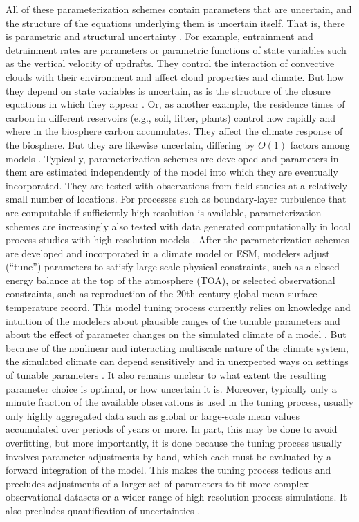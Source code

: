\documentclass[draft]{agujournal}
\begin{document}
All of these parameterization schemes contain parameters that are uncertain, and the structure of the equations underlying them is uncertain itself. That is, there is parametric and structural uncertainty \citep{Draper95}. For example, entrainment and detrainment rates are parameters or parametric functions of state variables such as the vertical velocity of updrafts. They control the interaction of convective clouds with their environment and affect cloud properties and climate. But how they depend on state variables is uncertain, as is the structure of the closure equations in which they appear \citep[e.g.,][]{Stainforth05a,Holloway09a,Neelin09a,Romps10a,Nie12a,de-Rooy13a}. Or, as another example, the residence times of carbon in different reservoirs (e.g., soil, litter, plants) control how rapidly and where in the biosphere carbon accumulates. They affect the climate response of the biosphere. But they are likewise uncertain, differing by $O(1)$ factors among models \citep{Friedlingstein06a,Friedlingstein14a,Friend14a,Bloom16a}. Typically, parameterization schemes are developed and parameters in them are estimated independently of the  model into which they are eventually incorporated. They are tested with observations from field studies at a relatively small number of locations. For processes such as boundary-layer turbulence that are computable if sufficiently high resolution is available, parameterization schemes are increasingly also tested with data generated computationally in local process studies with high-resolution models \citep[e.g.,][]{Jakob03a,Jakob10a}. After the parameterization schemes are developed and incorporated in a climate model or ESM, modelers adjust (``tune'') parameters to satisfy large-scale  physical constraints, such as a closed energy balance at the top of the atmosphere (TOA), or selected observational constraints, such as reproduction of the 20th-century global-mean surface temperature record. This model tuning process currently relies on  knowledge and intuition of the modelers about plausible ranges of the tunable parameters and about the effect of parameter changes on the simulated climate of a model \citep{Randall97a,Mauritsen12a, Golaz13a,Hourdin13a, Flato13a, Hourdin17a}. But because of the nonlinear and interacting multiscale nature of the climate system, the simulated climate can depend sensitively and in unexpected ways on settings of tunable parameters \citep[e.g.,][]{Suzuki13a,Zhao16a}. It also remains unclear to what extent the resulting parameter choice is optimal, or how uncertain it is. Moreover, typically only a minute fraction of the available observations is used in the tuning process, usually only highly aggregated data such as global or large-scale mean values accumulated over periods of years or more. In part, this may be done to avoid overfitting, but more importantly, it is done because the tuning process usually involves parameter adjustments by hand, which each must be evaluated by a forward integration of the model. This makes the tuning process tedious and precludes adjustments of a larger set of parameters to fit more complex observational datasets or a wider range of high-resolution process simulations. It also precludes quantification of uncertainties \citep{Schirber13a,Hourdin17a}.
\end{document}
